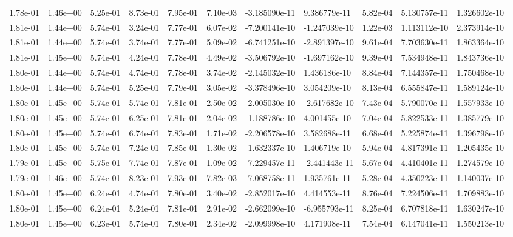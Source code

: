 \begin{longtable}{| p{} | p{} |}
1.78e-01 & 1.46e+00 & 5.25e-01 & 8.73e-01 & 7.95e-01 & 7.10e-03 & -3.185090e-11 &  9.386779e-11 &  5.82e-04 &  5.130757e-11 &  1.326602e-10 \\
1.81e-01 & 1.44e+00 & 5.74e-01 & 3.24e-01 & 7.77e-01 & 6.07e-02 & -7.200141e-10 & -1.247039e-10 &  1.22e-03 &  1.113112e-10 &  2.373914e-10 \\
1.81e-01 & 1.44e+00 & 5.74e-01 & 3.74e-01 & 7.77e-01 & 5.09e-02 & -6.741251e-10 & -2.891397e-10 &  9.61e-04 &  7.703630e-11 &  1.863364e-10 \\
1.81e-01 & 1.45e+00 & 5.74e-01 & 4.24e-01 & 7.78e-01 & 4.49e-02 & -3.506792e-10 & -1.697162e-10 &  9.39e-04 &  7.534948e-11 &  1.843736e-10 \\
1.80e-01 & 1.44e+00 & 5.74e-01 & 4.74e-01 & 7.78e-01 & 3.74e-02 & -2.145032e-10 &  1.436186e-10 &  8.84e-04 &  7.144357e-11 &  1.750468e-10 \\
1.80e-01 & 1.44e+00 & 5.74e-01 & 5.25e-01 & 7.79e-01 & 3.05e-02 & -3.378496e-10 &  3.054209e-10 &  8.13e-04 &  6.555847e-11 &  1.589124e-10 \\
1.80e-01 & 1.45e+00 & 5.74e-01 & 5.74e-01 & 7.81e-01 & 2.50e-02 & -2.005030e-10 & -2.617682e-10 &  7.43e-04 &  5.790070e-11 &  1.557933e-10 \\
1.80e-01 & 1.45e+00 & 5.74e-01 & 6.25e-01 & 7.81e-01 & 2.04e-02 & -1.188786e-10 &  4.001455e-10 &  7.04e-04 &  5.822533e-11 &  1.385779e-10 \\
1.80e-01 & 1.45e+00 & 5.74e-01 & 6.74e-01 & 7.83e-01 & 1.71e-02 & -2.206578e-10 &  3.582688e-11 &  6.68e-04 &  5.225874e-11 &  1.396798e-10 \\
1.80e-01 & 1.45e+00 & 5.74e-01 & 7.24e-01 & 7.85e-01 & 1.30e-02 & -1.632337e-10 &  1.406719e-10 &  5.94e-04 &  4.817391e-11 &  1.205435e-10 \\
1.79e-01 & 1.45e+00 & 5.75e-01 & 7.74e-01 & 7.87e-01 & 1.09e-02 & -7.229457e-11 & -2.441443e-11 &  5.67e-04 &  4.410401e-11 &  1.274579e-10 \\
1.79e-01 & 1.46e+00 & 5.74e-01 & 8.23e-01 & 7.93e-01 & 7.82e-03 & -7.068758e-11 &  1.935761e-11 &  5.28e-04 &  4.350223e-11 &  1.140037e-10 \\
1.80e-01 & 1.45e+00 & 6.24e-01 & 4.74e-01 & 7.80e-01 & 3.40e-02 & -2.852017e-10 &  4.414553e-11 &  8.76e-04 &  7.224506e-11 &  1.709883e-10 \\
1.80e-01 & 1.45e+00 & 6.24e-01 & 5.24e-01 & 7.81e-01 & 2.91e-02 & -2.662099e-10 & -6.955793e-11 &  8.25e-04 &  6.707818e-11 &  1.630247e-10 \\
1.80e-01 & 1.45e+00 & 6.23e-01 & 5.74e-01 & 7.80e-01 & 2.34e-02 & -2.099998e-10 &  4.171908e-11 &  7.54e-04 &  6.147041e-11 &  1.550213e-10 \\

\end{longtable}
